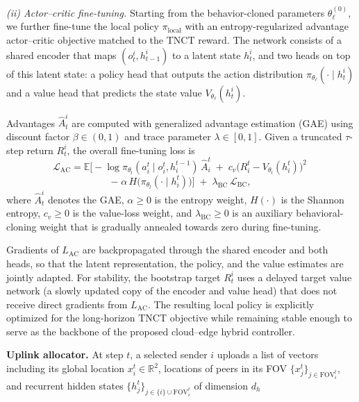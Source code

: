 \documentclass[conference]{IEEEtran}
\begin{document}
\textit{(ii) Actor--critic fine-tuning.}
Starting from the behavior-cloned parameters $\theta_\ell^{(0)}$, we further fine-tune the local policy $\pi_{\text{local}}$ with an entropy-regularized advantage actor–critic objective matched to the TNCT reward. The network consists of a shared encoder that maps $(o_t^i, h_{t-1}^i)$ to a latent state $h_t^i$, and two heads on top of this latent state: a policy head that outputs the action distribution $\pi_{\theta_\ell}(\cdot \mid h_t^i)$ and a value head that predicts the state value $V_{\theta_\ell}(h_t^i)$.

Advantages $\hat A_t^i$ are computed with generalized advantage estimation (GAE) using discount factor $\beta \in (0,1)$ and trace parameter $\lambda \in [0,1]$. Given a truncated $\tau$-step return $R_t^i$, the overall fine-tuning loss is
\begin{equation*}
\mathcal L_{\text{AC}}
= \mathbb{E}\!\Big[-\log \pi_{\theta_l}(a_i^t\mid o_i^t,h_i^{t-1})\,\hat A_i^t
\;+\; c_v\big(R_i^t - V_{\theta_l}(h_i^t)\big)^2
\;
\end{equation*}
\begin{equation*}
-\; \alpha\,H\big(\pi_{\theta_l}(\cdot\mid h_i^t)\big)\Big]
\;+\; \lambda_{\mathrm{BC}}\,\mathcal L_{\mathrm{BC}},
\end{equation*}
where $\hat A_t^i$ denotes the GAE, $\alpha \ge 0$ is the entropy weight, $H(\cdot)$ is the Shannon entropy, $c_v \ge 0$ is the value-loss weight, and $\lambda_{\mathrm{BC}} \ge 0$ is an auxiliary behavioral-cloning weight that is gradually annealed towards zero during fine-tuning.

Gradients of $L_{\mathrm{AC}}$ are backpropagated through the shared encoder and both heads, so that the latent representation, the policy, and the value estimates are jointly adapted. For stability, the bootstrap target $R_t^i$ uses a delayed target value network (a slowly updated copy of the encoder and value head) that does not receive direct gradients from $L_{\mathrm{AC}}$. The resulting local policy is explicitly optimized for the long-horizon TNCT objective while remaining stable enough to serve as the backbone of the proposed cloud–edge hybrid controller.




\textbf{Uplink allocator.}
At step $t$, a selected sender $i$ uploads a list of vectors including its global location $x_i^t\!\in\!\mathbb R^2$, locations of peers in its FOV $\{x_j^t\}_{j\in \mathrm{FOV}_i^t}$,
and recurrent hidden states $\{h_j^t\}_{j\in \{i\}\cup \mathrm{FOV}_i^t}$ of
dimension $d_h$ 
\end{document}
